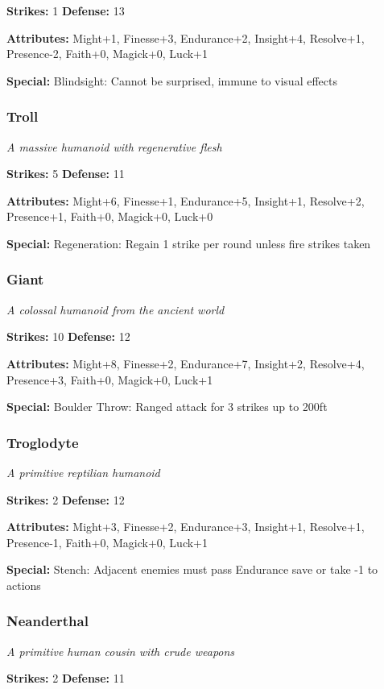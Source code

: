 \documentclass[10pt,twoside]{article}
\begin{document}
\textbf{Strikes:} 1 \quad \textbf{Defense:} 13

\textbf{Attributes:} Might+1, Finesse+3, Endurance+2, Insight+4, Resolve+1, Presence-2, Faith+0, Magick+0, Luck+1

\textbf{Special:} Blindsight: Cannot be surprised, immune to visual effects

\subsubsection{Troll}
\textit{A massive humanoid with regenerative flesh}

\textbf{Strikes:} 5 \quad \textbf{Defense:} 11

\textbf{Attributes:} Might+6, Finesse+1, Endurance+5, Insight+1, Resolve+2, Presence+1, Faith+0, Magick+0, Luck+0

\textbf{Special:} Regeneration: Regain 1 strike per round unless fire strikes taken

\subsubsection{Giant}
\textit{A colossal humanoid from the ancient world}

\textbf{Strikes:} 10 \quad \textbf{Defense:} 12

\textbf{Attributes:} Might+8, Finesse+2, Endurance+7, Insight+2, Resolve+4, Presence+3, Faith+0, Magick+0, Luck+1

\textbf{Special:} Boulder Throw: Ranged attack for 3 strikes up to 200ft

\subsubsection{Troglodyte}
\textit{A primitive reptilian humanoid}

\textbf{Strikes:} 2 \quad \textbf{Defense:} 12

\textbf{Attributes:} Might+3, Finesse+2, Endurance+3, Insight+1, Resolve+1, Presence-1, Faith+0, Magick+0, Luck+1

\textbf{Special:} Stench: Adjacent enemies must pass Endurance save or take -1 to actions

\subsubsection{Neanderthal}
\textit{A primitive human cousin with crude weapons}

\textbf{Strikes:} 2 \quad \textbf{Defense:} 11
\end{document}
